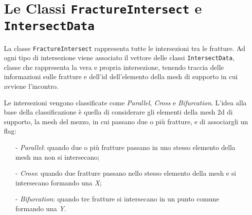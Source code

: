  \section{Le Classi \texttt{FractureIntersect} e \texttt{IntersectData}}

La classe \texttt{FractureIntersect} rappresenta tutte le intersezioni tra le fratture. Ad ogni tipo di intersezione viene associato il vettore delle classi \texttt{IntersectData}, classe che rappresenta la vera e propria intersezione, tenendo traccia delle informazioni sulle fratture e dell'id dell'elemento della mesh di supporto in cui avviene l'incontro.
\par Le intersezioni vengono classificate come \textit{Parallel}, \textit{Cross} e \textit{Bifurcation}.  L'idea alla base della classificazione è quella di considerare gli elementi della mesh 2d di supporto, la mesh del mezzo, in cui passano due o più fratture, e di associargli un flag:
\begin{enumerate}
\item[-] \textit{Parallel}: quando due o più fratture passano in uno stesso elemento della mesh ma non si intersecano;
\item[-] \textit{Cross}: quando due fratture passano nello stesso elemento della mesh e si intersecano formando una \textit{X};
\item[-] \textit{Bifurcation}: quando tre fratture si intersecano in un punto comune formando una \textit{Y}.
\end{enumerate}

